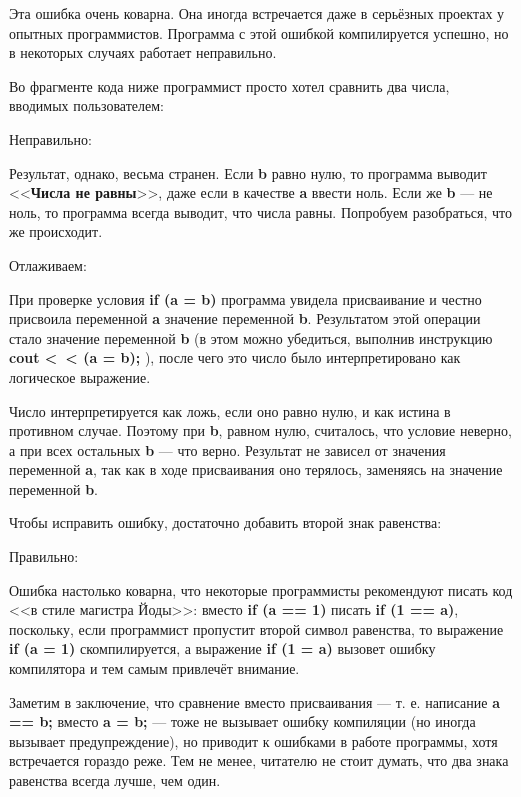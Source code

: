 \begin{typerror}
	\label{TE_assignment-instead-of-comparison}

	Эта ошибка очень коварна.
	Она иногда встречается даже в серьёзных проектах у опытных программистов.
	Программа с этой ошибкой компилируется успешно, но в некоторых случаях работает неправильно.

	Во фрагменте кода ниже программист просто хотел сравнить два числа, вводимых пользователем:

	Неправильно:

	Результат, однако, весьма странен.
	Если \textbf{b} равно нулю, то программа выводит <<\textbf{Числа не равны}>>, даже если в качестве \textbf{a} ввести ноль.
	Если же \textbf{b} --- не ноль, то программа всегда выводит, что числа равны.
	Попробуем разобраться, что же происходит.

	Отлаживаем:

	При проверке условия \textbf{if (a = b)} программа увидела присваивание
	и честно присвоила переменной \textbf{a} значение переменной \textbf{b}.
	Результатом этой операции стало значение переменной \textbf{b}
	(в этом можно убедиться, выполнив инструкцию \textbf{cout <~\!\!\!< (a = b);} ),
	после чего это число было интерпретировано как логическое выражение.

	Число интерпретируется как ложь, если оно равно нулю, и как истина в противном случае.
	Поэтому при \textbf{b}, равном нулю, считалось, что условие неверно,
	а при всех остальных \textbf{b} --- что верно.
	Результат не зависел от значения переменной \textbf{a},
	так как в ходе присваивания оно терялось, заменяясь на значение переменной \textbf{b}.

	Чтобы исправить ошибку, достаточно добавить второй знак равенства:

	Правильно:

	Ошибка настолько коварна, что некоторые программисты рекомендуют писать код <<в стиле магистра Йоды>>:
	вместо \textbf{if (a == 1)} писать \textbf{if (1 == a)},
	поскольку, если программист пропустит второй символ равенства,
	то  выражение \textbf{if (a = 1)} скомпилируется, а выражение \textbf{if (1 = a)} вызовет ошибку компилятора и тем самым привлечёт внимание.

	Заметим в заключение, что сравнение вместо присваивания --- т. е. написание \textbf{a == b;} вместо \textbf{a = b;}
	--- тоже не вызывает ошибку компиляции (но иногда вызывает предупреждение), но приводит к ошибками в работе программы,
	хотя встречается гораздо реже.
	Тем не менее, читателю не стоит думать, что два знака равенства всегда лучше, чем один.

\end{typerror}

